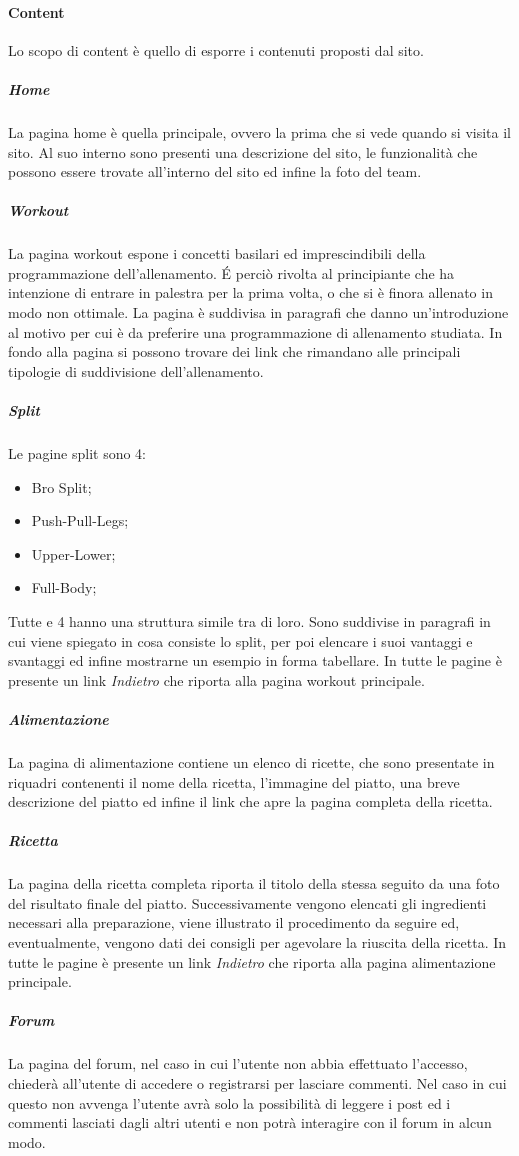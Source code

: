 \paragraph{Content}
Lo scopo di content è quello di esporre i contenuti proposti dal sito.
\subparagraph{Home}
La pagina home è quella principale, ovvero la prima che si vede quando si visita il sito. Al suo interno sono presenti una descrizione del sito, le funzionalità che possono essere trovate all'interno del sito ed infine la foto del team.
\subparagraph{Workout}
La pagina workout espone i concetti basilari ed imprescindibili della programmazione dell'allenamento. É perciò rivolta al principiante che ha intenzione di entrare in palestra per la prima volta, o che si è finora allenato in modo non ottimale.
La pagina è suddivisa in paragrafi che danno un'introduzione al motivo per cui è da preferire una programmazione di allenamento studiata.
In fondo alla pagina si possono trovare dei link che rimandano alle principali tipologie di suddivisione dell'allenamento.
\subparagraph{Split}
Le pagine split sono 4:
\begin{itemize}
\item Bro Split;
\item Push-Pull-Legs;
\item Upper-Lower;
\item Full-Body;
\end{itemize}           
Tutte e 4 hanno una struttura simile tra di loro.
Sono suddivise in paragrafi in cui viene spiegato in cosa consiste lo split, per poi elencare i suoi vantaggi e svantaggi ed infine mostrarne un esempio in forma tabellare.
In tutte le pagine è presente un link \textit{Indietro} che riporta alla pagina workout principale. 
\subparagraph{Alimentazione}
La pagina di alimentazione contiene un elenco di ricette, che sono presentate in riquadri contenenti il nome della ricetta, l’immagine
del piatto, una breve descrizione del piatto ed infine il link che apre la pagina completa della ricetta. 
\subparagraph{Ricetta}
La pagina della ricetta completa riporta il titolo della stessa seguito da una foto del risultato finale del piatto. Successivamente vengono elencati gli ingredienti necessari alla preparazione, viene illustrato il procedimento da seguire ed, eventualmente, vengono dati dei consigli per agevolare la riuscita della ricetta. In tutte le pagine è presente un link \textit{Indietro} che riporta alla pagina alimentazione principale.
\subparagraph{Forum}
La pagina del forum, nel caso in cui l'utente non abbia effettuato l'accesso, chiederà all'utente di accedere o registrarsi per lasciare commenti. Nel caso in cui questo non avvenga l'utente avrà solo la possibilità di leggere i post ed i commenti lasciati dagli altri utenti e non potrà interagire con il forum in alcun modo.
